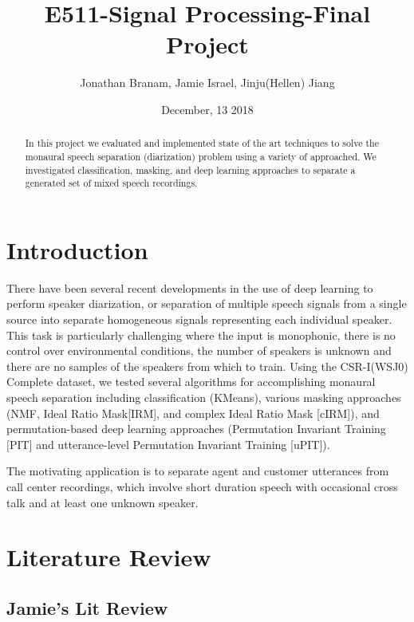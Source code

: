\documentclass[journal, a4paper]{IEEEtran}
\begin{document}
	\title{E511-Signal Processing-Final Project}
	\author{Jonathan Branam, Jamie Israel, Jinju(Hellen) Jiang}
	\date{December, 13 2018}
	\maketitle
%
\begin{abstract}
In this project we evaluated and implemented state of the art techniques to solve the monaural speech separation (diarization) problem using a variety of approached. We investigated classification, masking, and deep learning approaches to separate a generated set of mixed speech recordings.
\end{abstract}

\section{Introduction}
There have been several recent developments in the use of deep learning to perform speaker diarization, or separation of multiple speech signals from a single source into separate homogeneous signals representing each individual speaker. This task is particularly challenging where the input is monophonic, there is no control over environmental conditions, the number of speakers is unknown and there are no samples of the speakers from which to train. Using the CSR-I(WSJ0) Complete dataset\cite{WSJintro}, we tested several algorithms for accomplishing monaural speech separation including classification (KMeans), various masking approaches (NMF, Ideal Ratio Mask[IRM], and complex Ideal Ratio Mask [cIRM]), and permutation-based deep learning approaches (Permutation Invariant Training [PIT] and utterance-level Permutation Invariant Training [uPIT]).

The motivating application is to separate agent and customer utterances from call center recordings, which involve short duration speech with occasional cross talk and at least one unknown speaker.

\section{Literature Review}

\subsection{Jamie's Lit Review}
\end{document}

